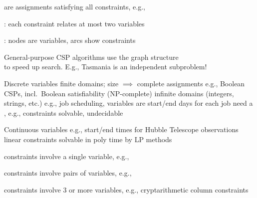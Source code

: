 \documentclass{article}
\begin{document}
\begin{huge}
\vspace*{0.1in}

\textwidth
{}

 are assignments satisfying all constraints, e.g.,\\




: each constraint relates at most two variables

: nodes are variables, arcs show constraints

\vspace*{-0.5in}

\textwidth
{}

General-purpose CSP algorithms use the graph structure\\
to speed up search. E.g., Tasmania is an independent subproblem!


Discrete variables\al
  finite domains; size  $\implies$  complete assignments\nl
    \blob e.g., Boolean CSPs, incl.~Boolean satisfiability (NP-complete)\al
  infinite domains (integers, strings, etc.)\nl
    \blob e.g., job scheduling, variables are start/end days for each job\nl
    \blob need a , e.g., \nl
    \blob {} constraints solvable,  undecidable

Continuous variables\al
    \blob e.g., start/end times for Hubble Telescope observations\al
    \blob linear constraints solvable in poly time by LP methods


 constraints involve a single variable, \al
   e.g., 

 constraints involve pairs of variables, \al
   e.g., 

 constraints involve 3 or more variables,\al
   e.g., cryptarithmetic column constraints


\end{huge}
\end{document}
